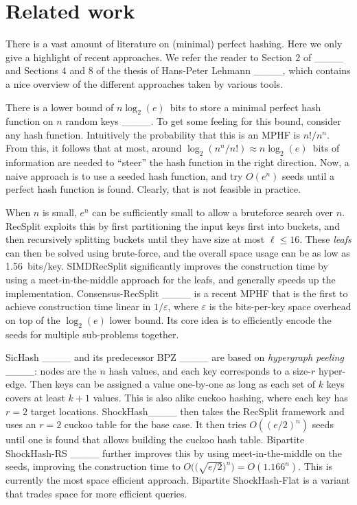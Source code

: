 \section{Related work}
\label{sec:org04db7a4}
There is a vast amount of literature on (minimal) perfect hashing. Here we only
give a highlight of recent approaches. We refer the reader to Section 2 of
____ and Sections 4 and 8 of the thesis of Hans-Peter Lehmann
____, which contains a nice overview of the different approaches
taken by various tools.

There is a lower bound of \(n \log_2(e)\)~bits to store a minimal perfect hash
function on \(n\) random keys ____.
To get some feeling for this bound, consider any hash function.
Intuitively the probability that this is
an MPHF is \(n!/n^n\). From this, it follows that at most, around
\(\log_2(n^n/n!)\approx n\log_2(e)\)~bits of information are needed to ``steer'' the hash
function in the right direction.
Now, a naive approach is to use a seeded hash function, and try
\(O(e^n)\) seeds until a perfect hash function is found. Clearly, that is not
feasible in practice.

When \(n\) is small, \(e^n\) can be sufficiently small to allow a bruteforce search
over \(n\). RecSplit exploits this by first partitioning the input
keys first into buckets, and then recursively splitting buckets until they have
size at most \(\ell \leq 16\). These \emph{leafs} can then be solved using brute-force, and the
overall space usage can be as low as 1.56~bits/key. SIMDRecSplit significantly
improves the construction time by using a meet-in-the-middle approach for the
leafs, and generally speeds up the implementation.
Consensus-RecSplit ____ is a recent MPHF that is the first to
achieve construction time linear in \(1/\varepsilon\), where \(\varepsilon\) is the
bits-per-key space overhead on top of the \(\log_2(e)\) lower bound. Its core idea
is to efficiently encode the seeds for multiple sub-problems together.

SicHash ____ and its predecessor BPZ ____ are based on
\emph{hypergraph peeling} ____: nodes are the \(n\) hash values, and each key
corresponds to a size-\(r\) hyper-edge. Then keys can be assigned a value
one-by-one as long as each set of \(k\) keys covers at least \(k+1\) values. This
is also alike cuckoo hashing, where each key has \(r=2\) target locations.
ShockHash____ then takes the RecSplit framework and uses an \(r=2\)
cuckoo table for the base case. It then tries \(O((e/2)^n)\) seeds until one is
found that allows building the cuckoo hash table.
Bipartite ShockHash-RS ____
further improves this by using meet-in-the-middle on the seeds, improving the
construction time to \(O\big(\big(\sqrt{e/2}\big)^n\big) = O(1.166^n)\). This is currently the
most space efficient approach. Bipartite ShockHash-Flat is a variant that trades
space for more efficient queries.

